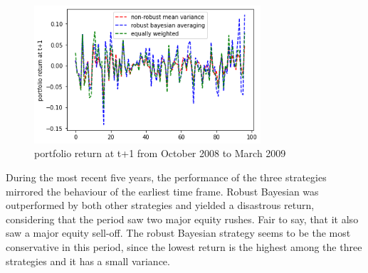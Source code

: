\begin{figure}[h]
    \centering
    \includegraphics[width=0.75\textwidth]{Images/return.png}
    \caption{portfolio return at t+1 from October 2008 to March 2009}
    \label{fig:mesh1}
\end{figure}

During the most recent five years, the performance of the three strategies mirrored the behaviour of the earliest time frame. Robust Bayesian was outperformed by both other strategies and yielded a disastrous return, considering that the period saw two major equity rushes. Fair to say, that it also saw a major equity sell-off. The robust Bayesian strategy seems to be the most conservative in this period, since the lowest return is the highest among the three strategies and it has a small variance.


